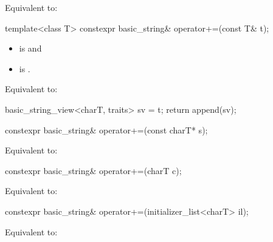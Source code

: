 \begin{itemdescr}
\pnum
\effects
Equivalent to: 


\end{itemdescr}

%
\begin{itemdecl}
template<class T>
  constexpr basic_string& operator+=(const T& t);
\end{itemdecl}

\begin{itemdescr}
\pnum
\constraints
\begin{itemize}
\item
{} is
 and
\item
{} is
.
\end{itemize}

\pnum
\effects
Equivalent to:
\begin{codeblock}
basic_string_view<charT, traits> sv = t;
return append(sv);
\end{codeblock}
\end{itemdescr}

%
\begin{itemdecl}
constexpr basic_string& operator+=(const charT* s);
\end{itemdecl}

\begin{itemdescr}
\pnum
\effects
Equivalent to: 
\end{itemdescr}

%
\begin{itemdecl}
constexpr basic_string& operator+=(charT c);
\end{itemdecl}

\begin{itemdescr}
\pnum
\effects
Equivalent to: 
\end{itemdescr}

%
\begin{itemdecl}
constexpr basic_string& operator+=(initializer_list<charT> il);
\end{itemdecl}

\begin{itemdescr}
\pnum
\effects
Equivalent to: 
\end{itemdescr}


